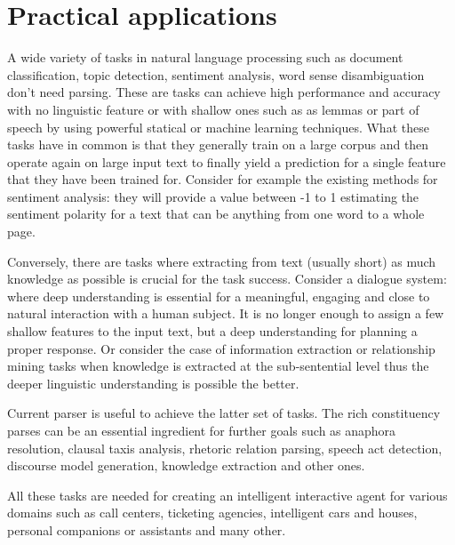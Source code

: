 
\section{Practical applications}
A wide variety of tasks in natural language processing such as document classification, topic detection, sentiment analysis, word sense disambiguation don't need parsing. These are tasks can achieve high performance and accuracy with no linguistic feature or with shallow ones such as as lemmas or part of speech by using powerful statical or machine learning techniques. What these tasks have in common is that they generally train on a large corpus and then operate again on large input text to finally yield a prediction for a single feature that they have been trained for. Consider for example the existing methods for sentiment analysis: they will provide a value between -1 to 1 estimating the sentiment polarity for a text that can be anything from one word to a whole page. 
 
Conversely, there are tasks where extracting from text (usually short) as much knowledge as possible is crucial for the task success. Consider a dialogue system: where deep understanding is essential for a meaningful, engaging and close to natural interaction with a human subject. It is no longer enough to assign a few shallow features to the input text, but a deep understanding for planning a proper response. Or consider the case of information extraction or relationship mining tasks when knowledge is extracted at the sub-sentential level thus the deeper linguistic understanding is possible the better. 

Current parser is useful to achieve the latter set of tasks. The rich constituency parses can be an essential ingredient for further goals such as anaphora resolution, clausal taxis analysis, rhetoric relation parsing, speech act detection, discourse model generation, knowledge extraction and other ones.   

All these tasks are needed for creating an intelligent interactive agent for various domains such as call centers, ticketing agencies, intelligent cars and houses, personal companions or assistants and many other. 

